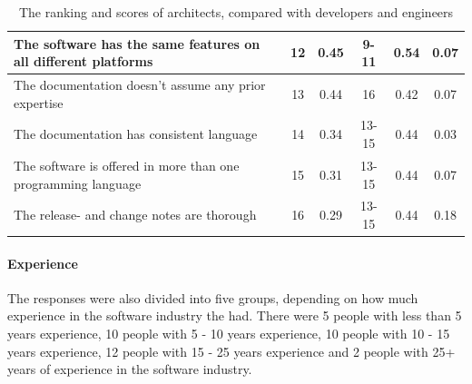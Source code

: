 \documentclass{article}
\begin{document}
\begin{table}[H]
\begin{tabularx}{\columnwidth}{X|c:c|c:c|c|}
The software has the same features on all different platforms         &              12 & 0.45       &         9-11 & 0.54           & 0.07  \\ \hline
The documentation doesn't assume any prior expertise                  &              13 & 0.44       &           16 & 0.42           & 0.07  \\ \hline
The documentation has consistent language                             &              14 & 0.34       &        13-15 & 0.44           & 0.03  \\ \hline
The software is offered in more than one programming language         &              15 & 0.31       &        13-15 & 0.44           & 0.07  \\ \hline
The release- and change notes are thorough                            &              16 & 0.29       &        13-15 & 0.44           & 0.18  \\ \hline
\end{tabularx}
\caption{The ranking and scores of architects, compared with developers and engineers}
\label{tab:arch-devs}
\end{table}


\paragraph{Experience}

The responses were also divided into five groups, depending on how much
experience in the software industry the had. There were 5 people with
less than 5 years experience, 10 people with 5 - 10 years experience, 10
people with 10 - 15 years experience, 12 people with 15 - 25 years
experience and 2 people with 25+ years of experience in the software
industry.
\end{document}

